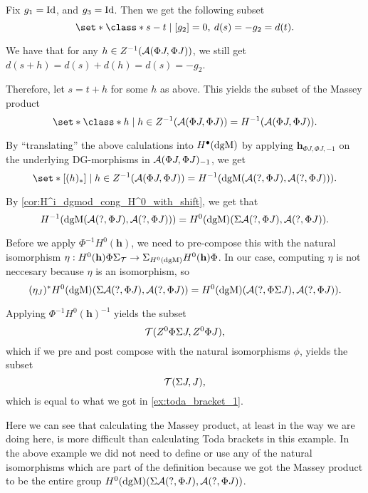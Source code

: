 \begin{example}
    Fix \( g_1 = \operatorname{Id} \), and \( g_3 = \operatorname{Id} \). Then we get the following subset
    \[
        \set*{ \class*{ s - t } \mid [g_2] = 0, \:  d(s) = - g_2 = d(t) }.
    \]

    We have that for any \( h \in Z^{-1}({\mathcal{A}}(\Phi J, \Phi J)) \), we still get \( d(s + h) = d(s) + d(h) = d(s) = - g_2 \).

    Therefore, let \( s = t + h \) for some \( h \) as above. This yields the subset of the Massey product
    \[
        \set*{ \class*{ h } \mid h \in Z^{-1}(\Ac(\Phi J, \Phi J)) } = H^{-1}(\Ac(\Phi J, \Phi J)).
    \]

    By ``translating'' the above calulations into \( H^{\bullet}(\operatorname{dgM}) \) by applying \( \mathbf{h}_{\Phi J, \Phi J, -1} \) on the underlying DG-morphisms in \( {\mathcal{A}}(\Phi J, \Phi J)_{-1} \), we get
    \[
        \set*{ [(h)_*] \mid h \in Z^{-1}(\Ac(\Phi J, \Phi J)) } = H^{-1}(\dgM(\Ac(?, \Phi J), \Ac(?, \Phi J))).
    \]

    By \autoref{cor:H^i_dgmod_cong_H^0_with_shift}, we get that
    \[
        H^{-1}(\operatorname{dgM}({\mathcal{A}}(?, \Phi J), {\mathcal{A}}(?, \Phi J))) = H^0(\operatorname{dgM})(\Sigma {\mathcal{A}}(?, \Phi J), {\mathcal{A}}(?, \Phi J)).
    \]

    Before we apply \( \Phi^{-1} H^0(\mathbf{h}) \), we need to pre-compose this with the natural isomorphism \( \eta: H^0(\mathbf{h}) \Phi \Sigma_{{\mathcal{T}}} \to \Sigma_{H^0(\operatorname{dgM})} H^0(\mathbf{h}) \Phi \). In our case, computing \( \eta \) is not neccesary because \( \eta \) is an isomorphism, so
    \[
        (\eta_J)^* H^0(\operatorname{dgM})(\Sigma {\mathcal{A}}(?, \Phi J), {\mathcal{A}}(?, \Phi J)) = H^0(\operatorname{dgM})({\mathcal{A}}(?, \Phi \Sigma J), {\mathcal{A}}(?, \Phi J)).
    \]

    Applying \( \Phi^{-1} H^0(\mathbf{h})^{-1} \) yields the subset
    \[
        {\mathcal{T}}(Z^0 \Phi \Sigma J, Z^0 \Phi J),
    \]
    which if we pre and post compose with the natural isomorphisms \( \phi \), yields the subset
    \[
        {\mathcal{T}}(\Sigma J, J),
    \]
    which is equal to what we got in \autoref{ex:toda_bracket_1}.
\end{example}

Here we can see that calculating the Massey product, at least in the way we are doing here, is more difficult than calculating Toda brackets in this example. In the above example we did not need to define or use any of the natural isomorphisms which are part of the definition because we got the Massey product to be the entire group \( H^0(\operatorname{dgM})(\Sigma {\mathcal{A}}(?, \Phi J), {\mathcal{A}}(?, \Phi J)) \).

